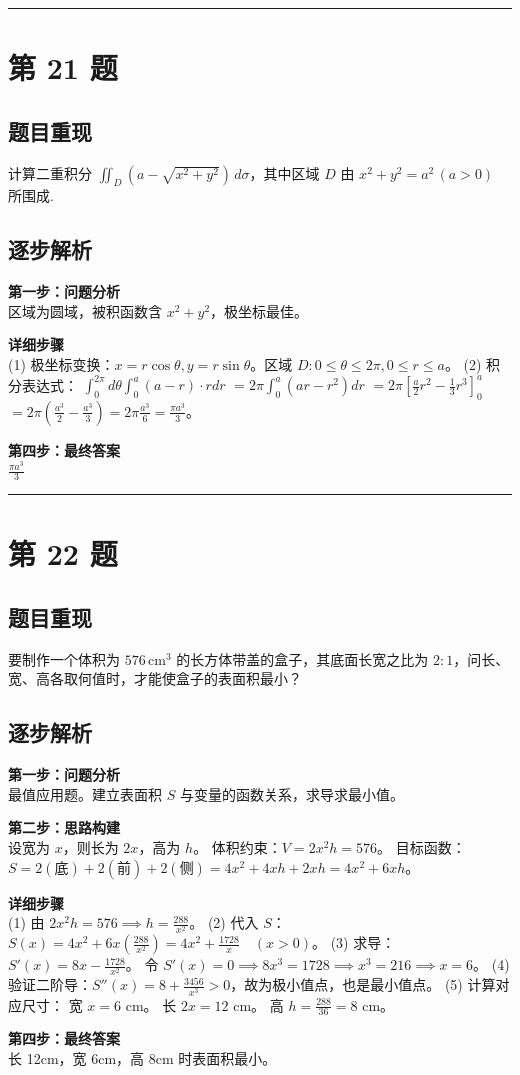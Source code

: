 \documentclass[10pt, a4paper]{ctexart}
\newcommand{\problemheader}{
    \vspace{0.5cm}
    \noindent\rule[0.5ex]{\linewidth}{2pt} %
}
\newcommand{\analysisheader}{
    \vspace{0.2cm}
    \noindent{\color{red}\rule[0.5ex]{\linewidth}{0.5pt}} %
    \vspace{0.1cm}
}
\begin{document}
\problemheader
\section*{第 21 题}
\subsection*{题目重现}
计算二重积分 $\iint_{D} (a - \sqrt{x^2+y^2}) \, d\sigma$，其中区域 $D$ 由 $x^2 + y^2 = a^2 \, (a > 0)$ 所围成.

\analysisheader
{\color{red}
\subsection*{逐步解析}
\textbf{第一步：问题分析} \\
区域为圆域，被积函数含 $x^2+y^2$，极坐标最佳。

\textbf{详细步骤} \\
(1) 极坐标变换：$x=r\cos\theta, y=r\sin\theta$。区域 $D: 0 \le \theta \le 2\pi, 0 \le r \le a$。
(2) 积分表达式：
$\int_0^{2\pi} d\theta \int_0^a (a - r) \cdot r dr$
$= 2\pi \int_0^a (ar - r^2) dr$
$= 2\pi \left[ \frac{a}{2}r^2 - \frac{1}{3}r^3 \right]_0^a$
$= 2\pi \left( \frac{a^3}{2} - \frac{a^3}{3} \right) = 2\pi \frac{a^3}{6} = \frac{\pi a^3}{3}$。

\textbf{第四步：最终答案} \\
$\frac{\pi a^3}{3}$
}

\problemheader
\section*{第 22 题}
\subsection*{题目重现}
要制作一个体积为 $576 \, \text{cm}^3$ 的长方体带盖的盒子，其底面长宽之比为 $2:1$，问长、宽、高各取何值时，才能使盒子的表面积最小？

\analysisheader
{\color{red}
\subsection*{逐步解析}
\textbf{第一步：问题分析} \\
最值应用题。建立表面积 $S$ 与变量的函数关系，求导求最小值。

\textbf{第二步：思路构建} \\
设宽为 $x$，则长为 $2x$，高为 $h$。
体积约束：$V = 2x^2 h = 576$。
目标函数：$S = 2(\text{底}) + 2(\text{前}) + 2(\text{侧}) = 4x^2 + 4xh + 2xh = 4x^2 + 6xh$。

\textbf{详细步骤} \\
(1) 由 $2x^2 h = 576 \implies h = \frac{288}{x^2}$。
(2) 代入 $S$：
$S(x) = 4x^2 + 6x \left( \frac{288}{x^2} \right) = 4x^2 + \frac{1728}{x} \quad (x>0)$。
(3) 求导：
$S'(x) = 8x - \frac{1728}{x^2}$。
令 $S'(x) = 0 \implies 8x^3 = 1728 \implies x^3 = 216 \implies x = 6$。
(4) 验证二阶导：$S''(x) = 8 + \frac{3456}{x^3} > 0$，故为极小值点，也是最小值点。
(5) 计算对应尺寸：
宽 $x = 6$ cm。
长 $2x = 12$ cm。
高 $h = \frac{288}{36} = 8$ cm。

\textbf{第四步：最终答案} \\
长 12cm，宽 6cm，高 8cm 时表面积最小。
}
\end{document}
